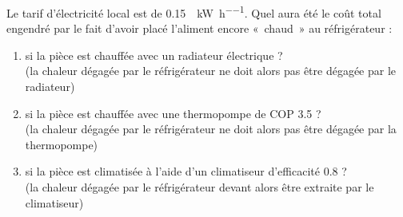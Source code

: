 	Le tarif d’électricité local est de \SI[per-mode = symbol]{0,15}{\euroo\per\kilo\watt\per\hour}. Quel aura été le coût total engendré par le fait d’avoir placé l’aliment encore «~chaud~» au réfrigérateur :
		
	\begin{enumerate}
		\item si la pièce est chauffée avec un radiateur électrique ? \\
			(la chaleur dégagée par le réfrigérateur ne doit alors pas être dégagée par le radiateur)
		\item si la pièce est chauffée avec une thermopompe de COP \num{3,5} ?	\\ 
			(la chaleur dégagée par le réfrigérateur ne doit alors pas être dégagée par la thermopompe)
		\item si la pièce est climatisée à l’aide d’un climatiseur d’efficacité \num{0,8} ?\\
			(la chaleur dégagée par le réfrigérateur devant alors être extraite par le climatiseur)
	\end{enumerate}

\exercisesolutionpage
\titreresultats
	\linktosolutionsblurb

